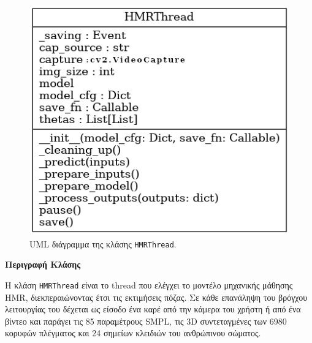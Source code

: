 \begin{figure}[H]
	\centering
	\includegraphics[scale=0.5]{images/chapter5/hmr_thread_uml.png}
	\caption{UML διάγραμμα της κλάσης \texttt{HMRThread}.}
	\label{fig:hmrthread}
\end{figure}

\noindent\textbf{Περιγραφή Κλάσης}

Η κλάση \texttt{HMRThread} είναι το thread που ελέγχει το μοντέλο μηχανικής μάθησης HMR, διεκπεραιώνοντας έτσι τις εκτιμήσεις πόζας. Σε κάθε επανάληψη του βρόγχου λειτουργίας του δέχεται ως είσοδο ένα καρέ από την κάμερα του χρήστη ή από ένα βίντεο και παράγει τις 85 παραμέτρους SMPL, τις 3D συντεταγμένες των 6980 κορυφών πλέγματος και 24 σημείων κλειδιών του ανθρώπινου σώματος.

